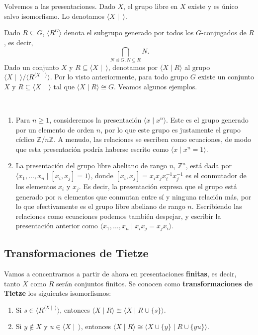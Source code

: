 \documentclass[bibtex, anon]{TEMat-article}
\newcommand{\Z}{\mathbb{Z}}
\providecommand{\gene}[1]{\langle{#1}\rangle}
\begin{document}
Volvemos a las presentaciones. Dado $X$, el grupo libre en $X$ existe y es único salvo isomorfismo. Lo denotamos $\gene{X\mid\ }$. 

Dado $R\subseteq G$, $\gene{R^G}$ denota el subgrupo generado por todos los $G$-conjugados de $R$, es decir, $$\bigcap_{N\trianglelefteq G, N\subseteq R} N.$$
Dado un conjunto $X$ y $R\subseteq\gene{X\mid\ }$, denotamos por $\gene{X\mid R}$ al grupo $\gene{X\mid\ }/\gene{R^{\gene{X\mid\ }}}$. Por lo visto anteriormente, para todo grupo $G$ existe un conjunto $X$ y $R\subseteq\gene{X\mid\ }$ tal que $\gene{X\mid R}\cong G$. Veamos algunos ejemplos. 

\begin{ejemplo}\
	\begin{enumerate}[label=\roman*]
		\item Para $n\geq 1$, consideremos la presentación $\gene{x\mid x^n}$. Este es el grupo generado por un elemento de orden $n$, por lo que este grupo es justamente el grupo cíclico $\Z/n\Z$. A menudo, las relaciones se escriben como ecuaciones, de modo que esta presentación podría haberse escrito como $\gene{x\mid x^n=1}$. 
	\item  La presentación del grupo libre abeliano de rango $n$, $\Z^n$, está dada por $\gene{x_1,\dots, x_n\mid [x_i,x_j]=1}$, donde $[x_i,x_j]=x_ix_jx_i^{-1}x_j^{-1}$ es el conmutador de los elementos $x_i$ y $x_j$. Es decir, la presentación expresa que el grupo está generado por $n$ elementos que conmutan entre sí y ninguna relación más, por lo que efectivamente es el grupo libre abeliano de rango $n$. Escribiendo las relaciones como ecuaciones podemos también despejar, y escribir la presentación anterior como $\gene{x_1,\dots, x_n\mid x_ix_j=x_jx_i}$. 
	\end{enumerate}
	\end{ejemplo}

\subsection{Transformaciones de Tietze}

Vamos a concentrarnos a partir de ahora en presentaciones \textbf{finitas}, es decir, tanto $X$ como $R$ serán conjuntos finitos. Se conocen como \textbf{transformaciones de Tietze} los siguientes isomorfismos:
\begin{enumerate}
	\item Si $s\in \gene{R^{\gene{X\mid\ }}}$, entonces $\gene{X\mid R}\cong\gene{X\mid R\cup\{s\}}$.
	\item Si $y\notin X$ y $u\in\gene{X\mid\ }$, entonces $\gene{X\mid R}\cong \gene{X\cup \{y\}\mid R\cup \{yu\}}$.
\end{enumerate}
\end{document}
